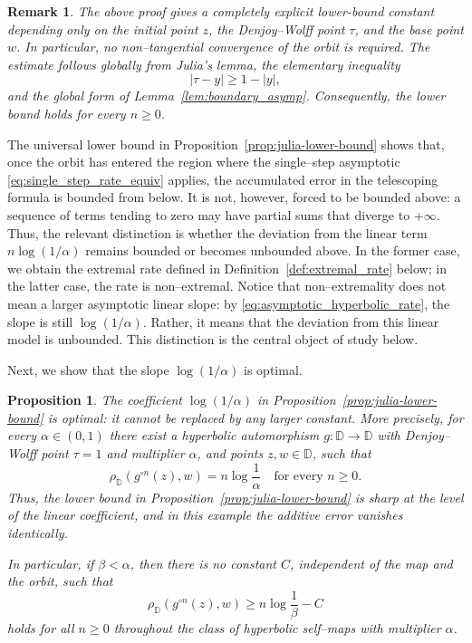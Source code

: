 \documentclass[10pt,a4paper]{amsart}
\numberwithin{equation}{section}
\newtheorem{proposition}[equation]{Proposition}
\newtheorem{remark}[equation]{Remark}
\begin{document}
\begin{remark}
The above proof gives a completely explicit lower-bound constant depending
only on the initial point $z$, the Denjoy--Wolff point $\tau$, and the
base point $w$. In particular, no non--tangential convergence of the
orbit is required. The estimate follows globally from Julia's lemma,
the elementary inequality
\begin{equation*}
|\tau-y|\geq1-|y|,
\end{equation*}
and the global form of Lemma~\ref{lem:boundary_asymp}.
Consequently, the lower bound holds for every $n\geq0$.
\end{remark}



The universal lower bound in Proposition~\ref{prop:julia-lower-bound}
shows that, once the orbit has entered the region where the
single--step asymptotic \eqref{eq:single_step_rate_equiv} applies, the
accumulated error in the telescoping formula is bounded from below.
It is not, however, forced to be bounded above: a sequence of terms
tending to zero may have partial sums that diverge to $+\infty$.
Thus, the relevant distinction is whether the deviation from the
linear term $n\log(1/\alpha)$ remains bounded or becomes unbounded
above. In the former case, we obtain the extremal rate defined in
Definition~\ref{def:extremal_rate} below; in the latter case, the rate is
non--extremal. Notice that non--extremality does not mean a larger
asymptotic linear slope: by \eqref{eq:asymptotic_hyperbolic_rate}, the
slope is still $\log(1/\alpha)$. Rather, it means that the deviation
from this linear model is unbounded. This distinction is the central object of study below.

Next, we show that the slope $\log(1/\alpha)$ is optimal.
\begin{proposition}
\label{prop:sharpness}
The coefficient $\log(1/\alpha)$ in
Proposition~\ref{prop:julia-lower-bound} is optimal: it cannot be
replaced by any larger constant. More precisely, for every
$\alpha\in(0,1)$ there exist a hyperbolic automorphism
$g:\mathbb{D}\to\mathbb{D}$ with Denjoy--Wolff point $\tau=1$ and
multiplier $\alpha$, and points $z,w\in\mathbb{D}$, such that
\begin{equation}
\label{eq:sharp_exact_rate}
\rho_{\mathbb{D}}(g^{\circ n}(z),w)
=
n\log\frac{1}{\alpha}
\quad\text{for every }n\geq0.
\end{equation}
Thus, the lower bound in Proposition~\ref{prop:julia-lower-bound}
is sharp at the level of the linear coefficient, and in this example
the additive error vanishes identically.

In particular, if $\beta<\alpha$, then there is no constant $C$,
independent of the map and the orbit, such that
\begin{equation*}
\rho_{\mathbb{D}}(g^{\circ n}(z),w)
\geq
n\log\frac{1}{\beta}-C
\end{equation*}
holds for all $n\geq0$ throughout the class of hyperbolic
self--maps with multiplier $\alpha$.
\end{proposition}
\end{document}

